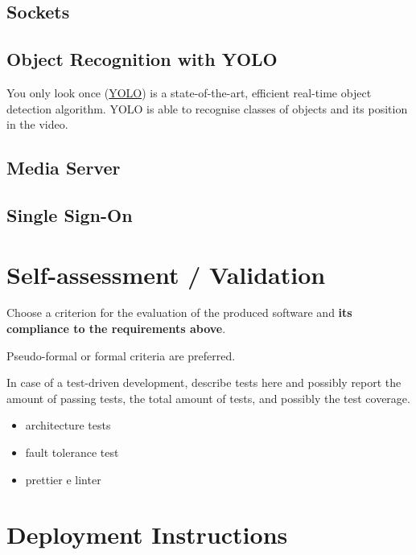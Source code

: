 \documentclass{scrartcl}
\begin{document}
    \subsection{Sockets}


    \subsection{Object Recognition with YOLO}
    You only look once (\href{https://pjreddie.com/darknet/yolo}{YOLO}) is a state-of-the-art, efficient real-time object detection algorithm.
    YOLO is able to recognise classes of objects and its position in the video.

    


    \subsection{Media Server}

    \subsection{Single Sign-On}

    \section{Self-assessment / Validation}

    Choose a criterion for the evaluation of the produced software and \textbf{its compliance to the requirements above}.

    Pseudo-formal or formal criteria are preferred.

    In case of a test-driven development, describe tests here and possibly report the amount of passing tests, the total amount of tests, and possibly the test coverage.

    \begin{itemize}
        \item architecture tests
        \item fault tolerance test
        \item prettier e linter
    \end{itemize}

    \section{Deployment Instructions}
\end{document}
